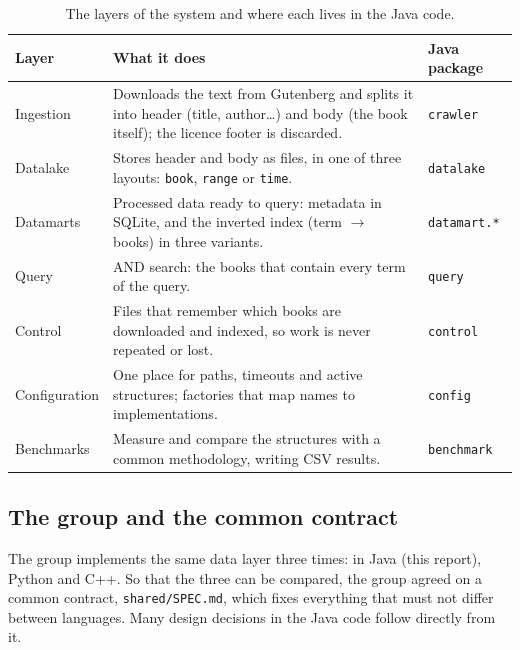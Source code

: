 \documentclass[11pt,a4paper]{article}
\newcommand{\code}[1]{\texttt{#1}}
\begin{document}
\begin{table}[H]
\centering\small
\begin{tabularx}{\linewidth}{@{}l Y l@{}}
\toprule
Layer & What it does & Java package \\
\midrule
Ingestion & Downloads the text from Gutenberg and splits it into header (title, author\ldots) and body (the book itself); the licence footer is discarded. & \code{crawler} \\
Datalake & Stores header and body as files, in one of three layouts: \code{book}, \code{range} or \code{time}. & \code{datalake} \\
Datamarts & Processed data ready to query: metadata in SQLite, and the inverted index (term $\rightarrow$ books) in three variants. & \code{datamart.*} \\
Query & AND search: the books that contain every term of the query. & \code{query} \\
Control & Files that remember which books are downloaded and indexed, so work is never repeated or lost. & \code{control} \\
Configuration & One place for paths, timeouts and active structures; factories that map names to implementations. & \code{config} \\
Benchmarks & Measure and compare the structures with a common methodology, writing CSV results. & \code{benchmark} \\
\bottomrule
\end{tabularx}
\caption{The layers of the system and where each lives in the Java code.}
\end{table}

\subsection{The group and the common contract}
The group implements the same data layer three times: in Java (this report), Python and C++. So
that the three can be compared, the group agreed on a common contract, \code{shared/SPEC.md}, which
fixes everything that must not differ between languages. Many design decisions in the Java code
follow directly from it.
\end{document}
